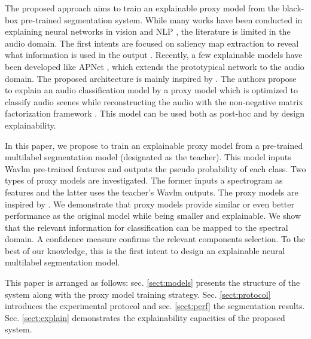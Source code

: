 The proposed approach aims to train an explainable proxy model from the black-box pre-trained segmentation system.
While many works have been conducted in explaining neural networks in vision \cite{ribeiro_why_2016} and NLP \cite{murphy_learning_2012}, the literature is limited in the audio domain.
The first intents are focused on saliency map extraction to reveal what information is used in the output \cite{}.
Recently, a few explainable models have been developed like APNet \cite{zinemanas2021interpretable}, which extends the prototypical network to the audio domain.
The proposed architecture is mainly inspired by \cite{parekh2023tackling}.
The authors propose to explain an audio classification model by a proxy model which is optimized to classify audio scenes while reconstructing the audio with the non-negative matrix factorization framework \cite{lee2000algorithms}.
This model can be used both as post-hoc and by design explainability.

In this paper, we propose to train an explainable proxy model from a pre-trained multilabel segmentation model (designated as the teacher).
This model inputs Wavlm pre-trained features and outputs the pseudo probability of each class.
Two types of proxy models are investigated.
The former inputs a spectrogram as features and the latter uses the teacher's Wavlm outputs.
The proxy models are inspired by \cite{parekh2023tackling}.
We demonstrate that proxy models provide similar or even better performance as the original model while being smaller and explainable.
We show that the relevant information for classification can be mapped to the spectral domain.
A confidence measure confirms the relevant components selection.
To the best of our knowledge, this is the first intent to design an explainable neural multilabel segmentation model.  

This paper is arranged as follows: sec. \ref{sect:models} presents the structure of the system along with the proxy model training strategy.
Sec. \ref{sect:protocol} introduces the experimental protocol and sec. \ref{sect:perf} the segmentation results. 
Sec. \ref{sect:explain} demonstrates the explainability capacities of the proposed system.









